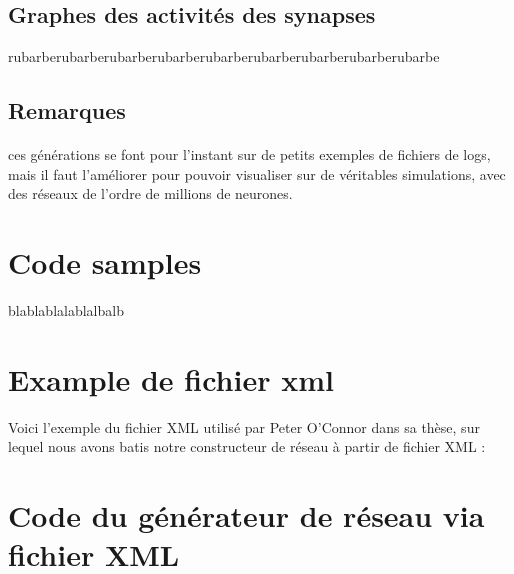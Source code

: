 \documentclass[a4paper,10pt]{article}
\begin{document}
\subsection{Graphes des activités des synapses}

rubarberubarberubarberubarberubarberubarberubarberubarberubarbe

\subsection*{Remarques}
\paragraph{}
ces générations se font pour l’instant sur de petits exemples de fichiers de logs, mais il faut l’améliorer pour pouvoir visualiser sur de véritables simulations, avec des réseaux de l’ordre de millions de neurones.

\appendix
\section{Code samples}

blablablalablalbalb

\section{Example de fichier xml}
\label{xml_exemple}

Voici l'exemple du fichier XML utilisé par Peter O'Connor dans sa thèse, sur lequel nous avons batis notre constructeur de réseau à partir de fichier XML :
 


\section{Code du générateur de réseau via fichier XML}
\label{xml_builder}

\end{document}
